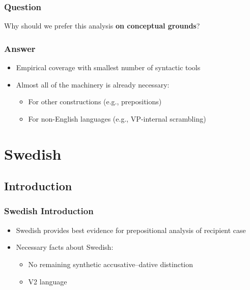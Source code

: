 \documentclass{beamer}
\begin{document}
\begin{frame}
	\frametitle{Question}
	\vfill
	\Large
		Why should we prefer this analysis \textbf{on conceptual grounds}?
	\vfill
\end{frame}

\begin{frame}
	\frametitle{Answer}
	\begin{itemize}
		\item Empirical coverage with smallest number of syntactic tools
		\item Almost all of the machinery is already necessary:
			\begin{itemize}
				\item For other constructions (e.g., prepositions)
				\item For non-English languages (e.g., VP-internal scrambling)
			\end{itemize}
	\end{itemize}
\end{frame}

\section{Swedish}
\subsection{Introduction}
\begin{frame}
	\frametitle{Swedish Introduction}
	\begin{itemize}
		\item Swedish provides best evidence for prepositional analysis of recipient case
		\item Necessary facts about Swedish:
		\begin{itemize}
			\item No remaining synthetic accusative--dative distinction
			\item V2 language
		\end{itemize}
	\end{itemize}
\end{frame}
\end{document}

